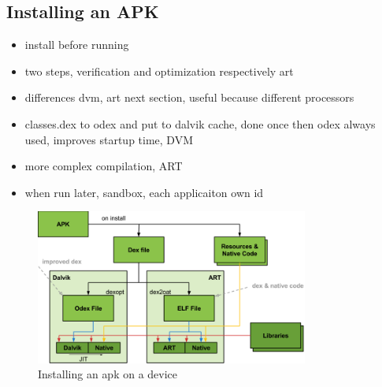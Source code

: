 \subsection{Installing an APK} \label{subsection:android-install}
\begin{itemize}
  \item install before running
  \item two steps, verification and optimization respectively art
  \item differences dvm, art next section, useful because different processors
  \item classes.dex to odex and put to dalvik cache, done once then odex always used, improves startup time, DVM
  \item more complex compilation, ART
  \item when run later, sandbox, each applicaiton own id
\end{itemize}
\begin{figure}[h]
    \centering
    \includegraphics[width=0.8\textwidth]{data/install.png}
    \caption{Installing an \gls{apk} on a device \cite{googleIOArt}}
    \label{fig:install}
\end{figure}
